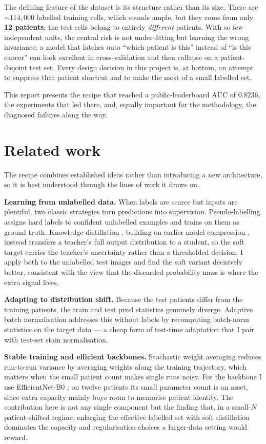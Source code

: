 \documentclass[11pt]{article}
\begin{document}
The defining feature of the dataset is its structure rather than its size. There are $\sim\!114{,}000$
labelled training cells, which sounds ample, but they come from only \textbf{12 patients}; the test
cells belong to entirely \emph{different} patients. With so few independent units, the central risk is
not under-fitting but learning the wrong invariance: a model that latches onto ``which patient is this''
instead of ``is this cancer'' can look excellent in cross-validation and then collapse on a
patient-disjoint test set. Every design decision in this project is, at bottom, an attempt to suppress
that patient shortcut and to make the most of a small labelled set.

This report presents the recipe that reached a public-leaderboard AUC of $0.8236$, the experiments that
led there, and, equally important for the methodology, the diagnosed failures along the way.

\section{Related work}

The recipe combines established ideas rather than introducing a new architecture, so it is best
understood through the lines of work it draws on.

\textbf{Learning from unlabelled data.} When labels are scarce but inputs are plentiful, two classic
strategies turn predictions into supervision. Pseudo-labelling \citep{lee2013} assigns hard labels to
confident unlabelled examples and trains on them as ground truth. Knowledge distillation
\citep{hinton2015}, building on earlier model compression \citep{bucila2006}, instead transfers a
teacher's full output distribution to a student, so the soft target carries the teacher's uncertainty
rather than a thresholded decision. I apply both to the unlabelled test images and find the soft variant
decisively better, consistent with the view that the discarded probability mass is where the extra
signal lives.

\textbf{Adapting to distribution shift.} Because the test patients differ from the training patients, the
train and test pixel statistics genuinely diverge. Adaptive batch normalisation \citep{li2016} addresses
this without labels by recomputing batch-norm statistics on the target data --- a cheap form of test-time
adaptation that I pair with test-set stain normalisation.

\textbf{Stable training and efficient backbones.} Stochastic weight averaging \citep{izmailov2018}
reduces run-to-run variance by averaging weights along the training trajectory, which matters when the
small patient count makes single runs noisy. For the backbone I use EfficientNet-B0 \citep{tan2019};
on twelve patients its small parameter count is an asset, since extra capacity mainly buys room to
memorise patient identity. The contribution here is not any single component but the finding that, in a
small-$N$ patient-shifted regime, enlarging the effective labelled set with soft distillation dominates
the capacity and regularisation choices a larger-data setting would reward.
\end{document}

